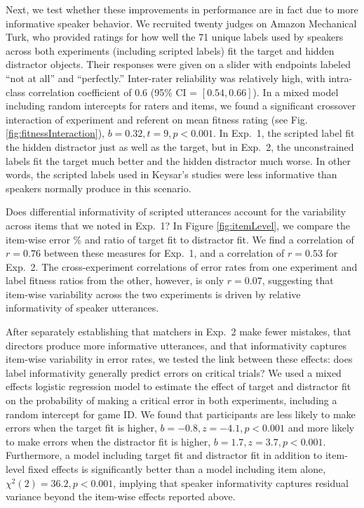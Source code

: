 \documentclass[10pt,letterpaper]{article}
\begin{document}
Next, we test whether these improvements in performance are in fact due to more informative speaker behavior. We recruited twenty judges on Amazon Mechanical Turk, who provided ratings for how well the 71 unique labels used by speakers across both experiments (including scripted labels) fit the target and hidden distractor objects. Their responses were given on a slider with endpoints labeled ``not at all'' and ``perfectly.''  Inter-rater reliability was relatively high, with intra-class correlation coefficient of $0.6$ (95\% CI = $[0.54, 0.66]$). In a mixed model including random intercepts for raters and items, we found a significant crossover interaction of experiment and referent on mean fitness rating (see Fig. \ref{fig:fitnessInteraction}), $b = 0.32, t = 9, p < 0.001$. In Exp.~1, the scripted label fit the hidden distractor just as well as the target, but in Exp.~2, the unconstrained labels fit the target much better and the hidden distractor much worse. In other words, the scripted labels used in Keysar's studies were less informative than speakers normally produce in this scenario.

Does differential informativity of scripted utterances account for the variability across items that we noted in Exp.~1? In Figure \ref{fig:itemLevel}, we compare the item-wise error \% and ratio of target fit to distractor fit. We find a correlation of $r = 0.76$ between these measures for Exp.~1, and a correlation of $r = 0.53$ for Exp.~2. The cross-experiment correlations of error rates from one experiment and label fitness ratios from the other, however, is only $r = 0.07$, suggesting that item-wise variability across the two experiments is driven by relative informativity of speaker utterances. 

After separately establishing that matchers in Exp.~2 make fewer mistakes, that directors produce more informative utterances, and that informativity captures item-wise variability in error rates, we tested the link between these effects: does label informativity generally predict errors on critical trials? We used a mixed effects logistic regression model to estimate the effect of target and distractor fit on the probability of making a critical error in both experiments, including a random intercept for game ID. We found that participants are less likely to make errors when the target fit is higher, $b = -0.8, z = -4.1, p < 0.001$ and more likely to make errors when the distractor fit is higher, $b = 1.7, z = 3.7, p < 0.001$. Furthermore, a model including target fit and distractor fit in addition to item-level fixed effects is significantly better than a model including item alone, $\chi^2(2) = 36.2, p < 0.001$, implying that speaker informativity captures residual variance beyond the item-wise effects reported above.
\end{document}
